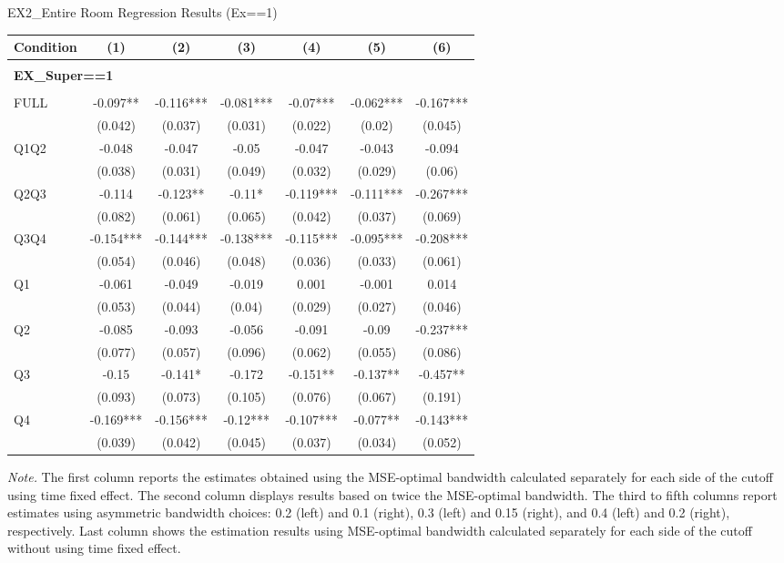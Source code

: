 \begin{table}[]
\TABLE
{EX2\_Entire Room Regression Results (Ex==1) \label{ex2_result_detail1}}{\begin{tabular}{lcccccc}
\hline
Condition & (1) & (2) & (3) & (4) & (5) & (6) \\ \hline
\\ 
\multicolumn{5}{l}{\textbf{EX\_Super==1}} \\ 
\\ 
FULL & -0.097** & -0.116*** & -0.081*** & -0.07*** & -0.062*** & -0.167*** \\ 
&(0.042)&(0.037) & (0.031)&(0.022)&(0.02)&(0.045)\\ 
Q1Q2 & -0.048 & -0.047 & -0.05 & -0.047 & -0.043 & -0.094 \\ 
&(0.038)&(0.031) & (0.049)&(0.032)&(0.029)&(0.06)\\ 
Q2Q3 & -0.114 & -0.123** & -0.11* & -0.119*** & -0.111*** & -0.267*** \\ 
&(0.082)&(0.061) & (0.065)&(0.042)&(0.037)&(0.069)\\ 
Q3Q4 & -0.154*** & -0.144*** & -0.138*** & -0.115*** & -0.095*** & -0.208*** \\ 
&(0.054)&(0.046) & (0.048)&(0.036)&(0.033)&(0.061)\\ 
Q1 & -0.061 & -0.049 & -0.019 & 0.001 & -0.001 & 0.014 \\ 
&(0.053)&(0.044) & (0.04)&(0.029)&(0.027)&(0.046)\\ 
Q2 & -0.085 & -0.093 & -0.056 & -0.091 & -0.09 & -0.237*** \\ 
&(0.077)&(0.057) & (0.096)&(0.062)&(0.055)&(0.086)\\ 
Q3 & -0.15 & -0.141* & -0.172 & -0.151** & -0.137** & -0.457** \\ 
&(0.093)&(0.073) & (0.105)&(0.076)&(0.067)&(0.191)\\ 
Q4 & -0.169*** & -0.156*** & -0.12*** & -0.107*** & -0.077** & -0.143*** \\ 
&(0.039)&(0.042) & (0.045)&(0.037)&(0.034)&(0.052)\\ 
\hline 
\end{tabular}}{\textit{Note.} The first column reports the estimates obtained using the MSE-optimal bandwidth calculated separately for each side of the cutoff using time fixed effect. The second column displays results based on twice the MSE-optimal bandwidth. The third to fifth columns report estimates using asymmetric bandwidth choices: 0.2 (left) and 0.1 (right), 0.3 (left) and 0.15 (right), and 0.4 (left) and 0.2 (right), respectively. Last column shows the estimation results using MSE-optimal bandwidth calculated separately for each side of the cutoff without using time fixed effect.}
\end{table}

